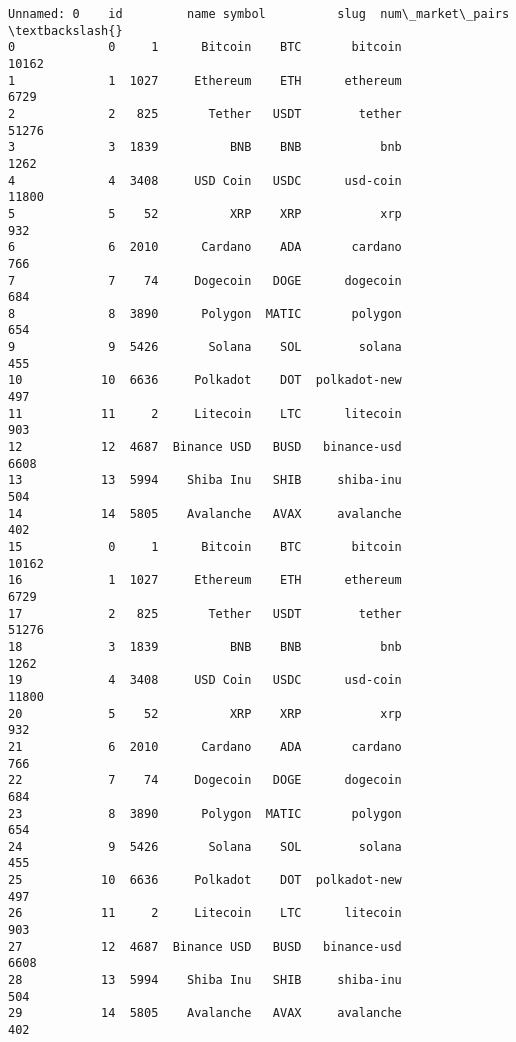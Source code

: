 \documentclass[11pt]{article}
\makeatletter
\newcommand{\boxspacing}{\kern\kvtcb@left@rule\kern\kvtcb@boxsep}
\newcommand{\prompt}[4]{
        {\ttfamily\llap{{\color{#2}[#3]:\hspace{3pt}#4}}\vspace{-\baselineskip}}
    }
\makeatother
\begin{document}
            \begin{tcolorbox}[breakable, size=fbox, boxrule=.5pt, pad at break*=1mm, opacityfill=0]
\prompt{Out}{outcolor}{46}{\boxspacing}
\begin{Verbatim}[commandchars=\\\{\}]
     Unnamed: 0    id         name symbol          slug  num\_market\_pairs  \textbackslash{}
0             0     1      Bitcoin    BTC       bitcoin             10162
1             1  1027     Ethereum    ETH      ethereum              6729
2             2   825       Tether   USDT        tether             51276
3             3  1839          BNB    BNB           bnb              1262
4             4  3408     USD Coin   USDC      usd-coin             11800
5             5    52          XRP    XRP           xrp               932
6             6  2010      Cardano    ADA       cardano               766
7             7    74     Dogecoin   DOGE      dogecoin               684
8             8  3890      Polygon  MATIC       polygon               654
9             9  5426       Solana    SOL        solana               455
10           10  6636     Polkadot    DOT  polkadot-new               497
11           11     2     Litecoin    LTC      litecoin               903
12           12  4687  Binance USD   BUSD   binance-usd              6608
13           13  5994    Shiba Inu   SHIB     shiba-inu               504
14           14  5805    Avalanche   AVAX     avalanche               402
15            0     1      Bitcoin    BTC       bitcoin             10162
16            1  1027     Ethereum    ETH      ethereum              6729
17            2   825       Tether   USDT        tether             51276
18            3  1839          BNB    BNB           bnb              1262
19            4  3408     USD Coin   USDC      usd-coin             11800
20            5    52          XRP    XRP           xrp               932
21            6  2010      Cardano    ADA       cardano               766
22            7    74     Dogecoin   DOGE      dogecoin               684
23            8  3890      Polygon  MATIC       polygon               654
24            9  5426       Solana    SOL        solana               455
25           10  6636     Polkadot    DOT  polkadot-new               497
26           11     2     Litecoin    LTC      litecoin               903
27           12  4687  Binance USD   BUSD   binance-usd              6608
28           13  5994    Shiba Inu   SHIB     shiba-inu               504
29           14  5805    Avalanche   AVAX     avalanche               402

\end{Verbatim}
\end{tcolorbox}
\end{document}
